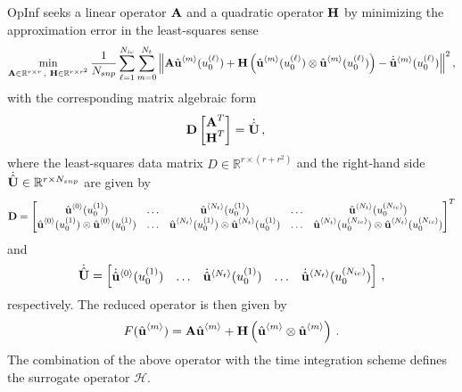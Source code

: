 OpInf seeks a linear operator $\textbf{A}$ and a quadratic operator $\textbf{H}$ by minimizing the approximation error in the least-squares sense
\begin{align}
    \min_{\textbf{A}\in\mathbb{R}^{r \times r}\,,~ \textbf{H}\in\mathbb{R}^{r \times r^2}} \dfrac{1}{N_{snp}} \sum_{\ell = 1}^{N_{ic}} \sum_{m = 0}^{N_t} {\left\lVert\textbf{A} \hat{\textbf{u}}^{\left<m\right>}(u_0^{(\ell)}) + \textbf{H}\left( \hat{\textbf{u}}^{\left<m\right>}(u_0^{(\ell)}) \otimes \hat{\textbf{u}}^{\left<m\right>}(u_0^{(\ell)})\right) - \dot{\hat{\textbf{u}}}^{\left<m\right>}(u_0^{(\ell)})\right\rVert}^2\,,\label{eq: opinf least squares}
\end{align}
with the corresponding matrix algebraic form
\begin{align}
    &\textbf{D}
    \begin{bmatrix}
        \textbf{A}^T\\
        \textbf{H}^T
    \end{bmatrix} = \dot{\hat{\textbf{U}}}\,,\label{eq:opinf}
\end{align}
where the least-squares data matrix $D \in \mathbb{R}^{r \times (r + r^2)}$ and the right-hand side $\dot{\hat{\textbf{U}}} \in \mathbb{R}^{r \times N_{snp}}$ are given by
\begin{align}
    \textbf{D} = 
    \begin{bmatrix}
        \hat{\textbf{u}}^{\left<0\right>}(u_0^{(1)})& \ldots & \hat{\textbf{u}}^{\left<N_t\right>}(u_0^{(1)}) & \ldots & \hat{\textbf{u}}^{\left<N_t\right>}(u_0^{(N_{ic})})\\
        \hat{\textbf{u}}^{\left<0\right>}(u_0^{(1)}) \otimes \hat{\textbf{u}}^{\left<0\right>}(u_0^{(1)}) & \ldots & \hat{\textbf{u}}^{\left<N_t\right>}(u_0^{(1)}) \otimes \hat{\textbf{u}}^{\left<N_t\right>}(u_0^{(1)}) & \ldots & \hat{\textbf{u}}^{\left<N_t\right>}(u_0^{(N_{ic})}) \otimes \hat{\textbf{u}}^{\left<N_t\right>}(u_0^{(N_{ic})})
    \end{bmatrix}^T
\end{align}
and
\begin{align}
    \dot{\hat{\textbf{U}}} = \begin{bmatrix} \dot{\hat{\textbf{u}}}^{\left<0\right>}(u_0^{(1)}) & \ldots & \dot{\hat{\textbf{u}}}^{\left<N_t\right>}(u_0^{(1)}) & \ldots & \dot{\hat{\textbf{u}}}^{\left<N_t\right>}(u_0^{(N_{ic})})
    \end{bmatrix}\,,
\end{align}
respectively. The reduced operator is then given by
\begin{align}
    F(\hat{\textbf{u}}^{\left<m\right>}) = \textbf{A}\hat{\textbf{u}}^{\left<m\right>} + \textbf{H} \left(\hat{\textbf{u}}^{\left<m\right>} \otimes \hat{\textbf{u}}^{\left<m\right>}\right)\,.
\end{align}
The combination of the above operator with the time integration scheme defines the surrogate operator $\mathcal{H}$.

